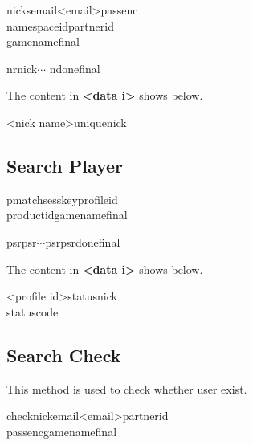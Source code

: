 \documentclass[oneside,titlepage,a4paper]{Definition/retrospy} %
\begin{document}
\begin{mybox}
	\tbs nicks\tbs\tbs email\tbs <email>\tbs passenc\tbs<encrypted password>\\\tbs namespaceid\tbs <namespace id>\tbs partnerid\tbs<partner id>\\\tbs gamename\tbs<game name>\tbs final\tbs
\end{mybox}

\ServerResponse

\begin{mybox}
	\tbs nr\tbs\tbs nick\tbs<data 1>\tbs<data 2>\tbs $\cdots$\tbs <data n> \tbs ndone\tbs final\tbs
\end{mybox}
The content in \textbf{<data i>} shows below.
\begin{mybox}
	 <nick name>\tbs uniquenick \tbs<unique nick>
\end{mybox}

\subsection{Search Player}

\ClientRequest

\begin{mybox}
	\tbs pmatch\tbs\tbs sesskey\tbs<session key>\tbs profileid\tbs<profile id>\\\tbs productid\tbs <product id>\tbs gamename\tbs <game name>\tbs final\tbs
\end{mybox}

\ServerResponse
\begin{mybox}
	\tbs psr\tbs <data 1>\tbs psr\tbs<data 2>\tbs $\cdots$\tbs psr\tbs <data n>\tbs psrdone\tbs final\tbs
\end{mybox}
The content in \textbf{<data i>} shows below.
\begin{mybox}
	<profile id>\tbs status\tbs<status string>\tbs nick\tbs<nick name>\\\tbs statuscode\tbs<status code>
\end{mybox}


\subsection{Search Check}
This method is used to check whether user exist.
\ClientRequest

\begin{mybox}
	\tbs check\tbs\tbs nick\tbs <nick name>\tbs email\tbs<email>\tbs partnerid\tbs <partner id>\\\tbs passenc\tbs<encrypted password>\tbs gamename\tbs<game name>\tbs final\tbs
\end{mybox}
\end{document}
